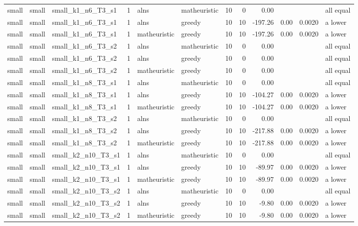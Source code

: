 \begin{tabular}{lllrllrrrrrl}
small & small & small\_k1\_n6\_T3\_s1 & 1 & alns & matheuristic & 10 & 0 & 0.00 &  &  & all equal \\
small & small & small\_k1\_n6\_T3\_s1 & 1 & alns & greedy & 10 & 10 & -197.26 & 0.00 & 0.0020 & a lower \\
small & small & small\_k1\_n6\_T3\_s1 & 1 & matheuristic & greedy & 10 & 10 & -197.26 & 0.00 & 0.0020 & a lower \\
small & small & small\_k1\_n6\_T3\_s2 & 1 & alns & matheuristic & 10 & 0 & 0.00 &  &  & all equal \\
small & small & small\_k1\_n6\_T3\_s2 & 1 & alns & greedy & 10 & 0 & 0.00 &  &  & all equal \\
small & small & small\_k1\_n6\_T3\_s2 & 1 & matheuristic & greedy & 10 & 0 & 0.00 &  &  & all equal \\
small & small & small\_k1\_n8\_T3\_s1 & 1 & alns & matheuristic & 10 & 0 & 0.00 &  &  & all equal \\
small & small & small\_k1\_n8\_T3\_s1 & 1 & alns & greedy & 10 & 10 & -104.27 & 0.00 & 0.0020 & a lower \\
small & small & small\_k1\_n8\_T3\_s1 & 1 & matheuristic & greedy & 10 & 10 & -104.27 & 0.00 & 0.0020 & a lower \\
small & small & small\_k1\_n8\_T3\_s2 & 1 & alns & matheuristic & 10 & 0 & 0.00 &  &  & all equal \\
small & small & small\_k1\_n8\_T3\_s2 & 1 & alns & greedy & 10 & 10 & -217.88 & 0.00 & 0.0020 & a lower \\
small & small & small\_k1\_n8\_T3\_s2 & 1 & matheuristic & greedy & 10 & 10 & -217.88 & 0.00 & 0.0020 & a lower \\
small & small & small\_k2\_n10\_T3\_s1 & 1 & alns & matheuristic & 10 & 0 & 0.00 &  &  & all equal \\
small & small & small\_k2\_n10\_T3\_s1 & 1 & alns & greedy & 10 & 10 & -89.97 & 0.00 & 0.0020 & a lower \\
small & small & small\_k2\_n10\_T3\_s1 & 1 & matheuristic & greedy & 10 & 10 & -89.97 & 0.00 & 0.0020 & a lower \\
small & small & small\_k2\_n10\_T3\_s2 & 1 & alns & matheuristic & 10 & 0 & 0.00 &  &  & all equal \\
small & small & small\_k2\_n10\_T3\_s2 & 1 & alns & greedy & 10 & 10 & -9.80 & 0.00 & 0.0020 & a lower \\
small & small & small\_k2\_n10\_T3\_s2 & 1 & matheuristic & greedy & 10 & 10 & -9.80 & 0.00 & 0.0020 & a lower \\

\end{tabular}
